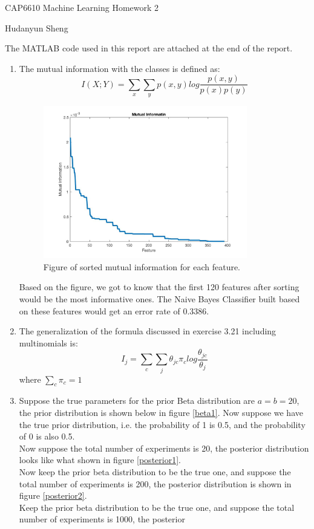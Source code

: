 \documentclass[a4paper]{article}
\begin{document}
\begin{spacing}{2.0}
\begin{flushleft}\begin{huge}CAP6610  Machine Learning   Homework 2\end{huge}\end{flushleft}
\begin{flushright}\begin{Large}Hudanyun Sheng\end{Large}\end{flushright}
The MATLAB code used in this report are attached at the end of the report.
\begin{enumerate}[(1)]
\item The mutual information with the classes is defined as:
$$I(X; Y) = \sum_x\sum_y p(x,y)log\displaystyle\frac{p(x,y)}{p(x)p(y)}$$
\begin{figure}[h]
\centering
\includegraphics[width=3.5in]{MI.jpg}
\caption{Figure of sorted mutual information for each feature.}
\end{figure}

Based on the figure, we got to know that the first 120 features after sorting would be the most informative ones. The Naive Bayes Classifier built based on these features would get an error rate of 0.3386.

\item The generalization of the formula discussed in exercise 3.21 including multinomials is:
$$I_j = \sum_c\sum_j\theta_{jc}\pi_c log\displaystyle\frac{\theta_{jc}}{\theta_j}$$
where $\sum_c \pi_c = 1$

\item Suppose the true parameters for the prior Beta distribution are $a=b=20$, the prior distribution is shown below in figure \ref{beta1}. Now suppose we have the true prior distribution, i.e. the probability of 1 is 0.5, and the probability of 0 is also 0.5.\\ 
Now suppose the total number of experiments is 20, the posterior distribution looks like what shown in figure \ref{posterior1}. \\
Now keep the prior beta distribution to be the true one, and suppose the total number of experiments is 200, the posterior distribution is shown in figure \ref{posterior2}.\\
Keep the prior beta distribution to be the true one, and suppose the total number of experiments is 1000, the posterior


\end{enumerate}
\end{spacing}
\end{document}
